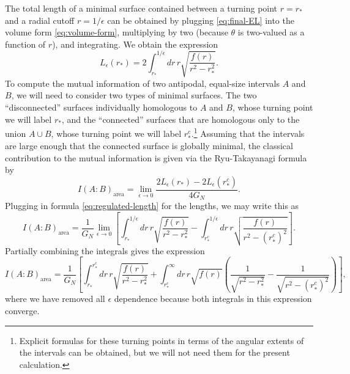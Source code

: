 \documentclass[a4paper,11pt]{article}
\begin{document}
The total length of a minimal surface contained between a turning point $r=r_*$ and a radial cutoff $r = 1/\epsilon$ can be obtained by plugging \eqref{eq:final-EL} into the volume form \eqref{eq:volume-form}, multiplying by two (because $\theta$ is two-valued as a function of $r$), and integrating. We obtain the expression
\begin{equation} \label{eq:regulated-length}
    L_{\epsilon}(r_*)
        = 2 \int_{r_*}^{1/\epsilon} dr\, r \sqrt{\frac{f(r)}{r^2 - r_*^2}}.
\end{equation}
To compute the mutual information of two antipodal, equal-size intervals $A$ and $B$, we will need to consider two types of minimal surfaces. The two ``disconnected'' surfaces individually homologous to $A$ and $B$, whose turning point we will label $r_*$, and the ``connected'' surfaces that are homologous only to the union $A \cup B$, whose turning point we will label $r_*^c$.\footnote{Explicit formulas for these turning points in terms of the angular extents of the intervals can be obtained, but we will not need them for the present calculation.} Assuming that the intervals are large enough that the connected surface is globally minimal, the classical contribution to the mutual information is given via the Ryu-Takayanagi formula by
\begin{equation}
    I(A:B)_{\text{area}} = \lim_{\epsilon \rightarrow 0} \frac{2 L_{\epsilon}(r_*) - 2 L_{\epsilon}(r_*^c)}{4 G_N}.
\end{equation}
Plugging in formula \eqref{eq:regulated-length} for the lengths, we may write this as
\begin{equation}
    I(A:B)_{\text{area}} = \frac{1}{G_N} \lim_{\epsilon \rightarrow 0} \left[ \int_{r_*}^{1/\epsilon} dr\, r \sqrt{\frac{f(r)}{r^2 - r_*^2}} - \int_{r_*^c}^{1/\epsilon} dr\, r \sqrt{\frac{f(r)}{r^2 - (r_*^c)^2}} \right].
\end{equation}
Partially combining the integrals gives the expression
\begin{equation}
    I(A:B)_{\text{area}} = \frac{1}{G_N} \left[ \int_{r_*}^{r_*^c} dr\, r \sqrt{\frac{f(r)}{r^2 - r_*^2}} + \int_{r_*^c}^{\infty} dr\, r \sqrt{f(r)} \left( \frac{1}{\sqrt{r^2 - r_*^2}}  - \frac{1}{\sqrt{r^2 - (r_*^c)^2}}  \right)\right],
\end{equation}
where we have removed all $\epsilon$ dependence because both integrals in this expression converge.
\end{document}
